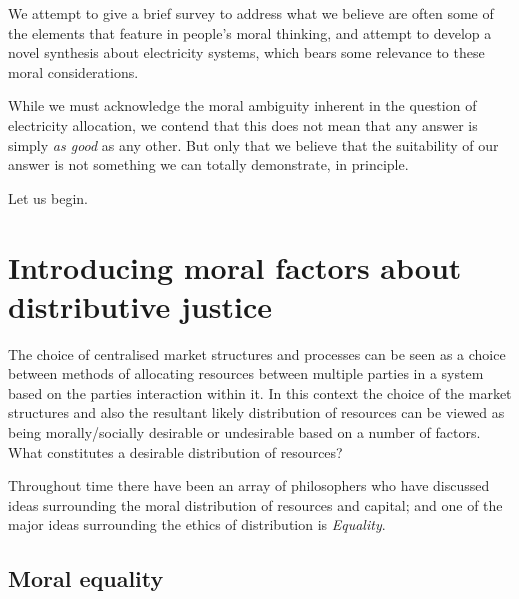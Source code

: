 
We attempt to give a brief survey to address what we believe are often some of the elements that feature in people's moral thinking, and attempt to develop a novel synthesis about electricity systems, which bears some relevance to these moral considerations.

While we must acknowledge the moral ambiguity inherent in the question of electricity allocation, we contend that this does not mean that any answer is simply \textit{as good} as any other. But only that we believe that the suitability of our answer is not something we can totally demonstrate, in principle.

Let us begin.

\section{Introducing moral factors about distributive justice}\DIFaddbegin \label{sec:introducing_moral_factors}
\DIFaddend 

The choice of centralised market structures and processes can be seen as a choice between methods of allocating resources between multiple parties in a system based on the parties interaction within it.
In this context the choice of the market structures and also the resultant likely distribution of resources can be viewed as being morally/socially desirable or undesirable based on a number of factors.
What constitutes a desirable distribution of resources?


Throughout time there have been an array of philosophers who have discussed ideas surrounding the moral distribution of resources and capital; and one of the major ideas surrounding the ethics of distribution is \textit{Equality}.

\subsection{Moral equality}\DIFaddbegin \label{sec_philosophy_moral_equality}
\DIFaddend 

